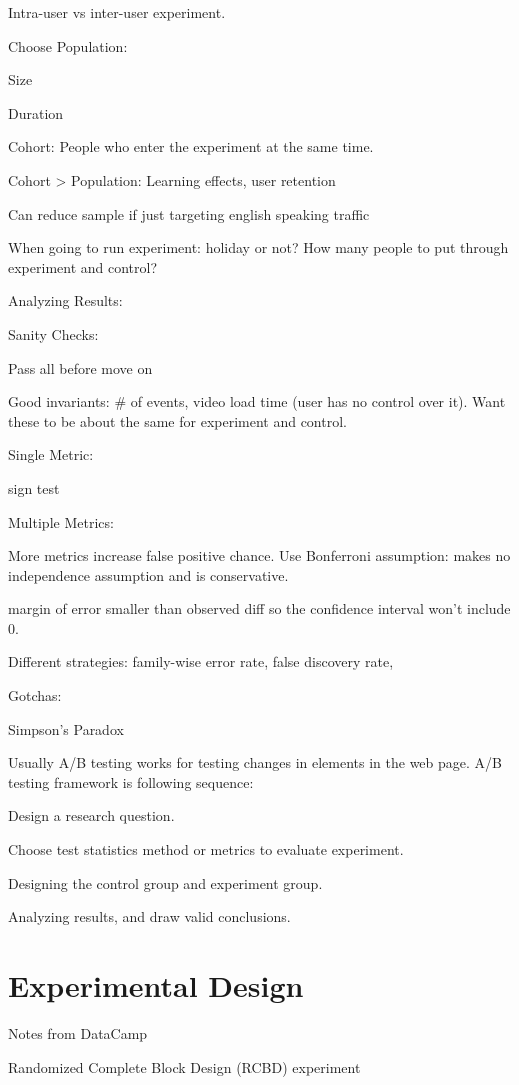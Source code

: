 \documentclass[]{book}
\begin{document}
Intra-user vs inter-user experiment.

Choose Population:

Size

Duration

Cohort: People who enter the experiment at the same time.

Cohort \textgreater{} Population: Learning effects, user retention

Can reduce sample if just targeting english speaking traffic

When going to run experiment: holiday or not? How many people to put through experiment and control?

Analyzing Results:

Sanity Checks:

Pass all before move on

Good invariants: \# of events, video load time (user has no control over it). Want these to be about the same for experiment and control.

Single Metric:

sign test

Multiple Metrics:

More metrics increase false positive chance. Use Bonferroni assumption: makes no independence assumption and is conservative.

margin of error smaller than observed diff so the confidence interval won't include 0.

Different strategies: family-wise error rate, false discovery rate,

Gotchas:

Simpson's Paradox

Usually A/B testing works for testing changes in elements in the web page. A/B testing framework is following sequence:

Design a research question.

Choose test statistics method or metrics to evaluate experiment.

Designing the control group and experiment group.

Analyzing results, and draw valid conclusions.

\hypertarget{experimental-design}{%
\section{Experimental Design}\label{experimental-design}}

Notes from DataCamp

Randomized Complete Block Design (RCBD) experiment
\end{document}
